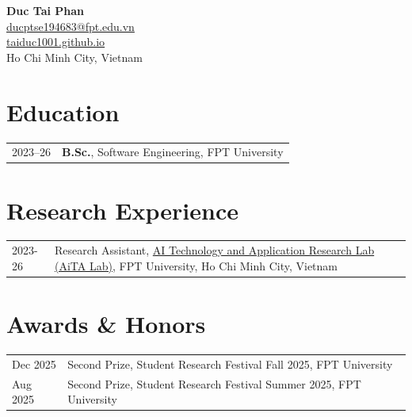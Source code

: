 \documentclass[11pt]{article} %
\newcommand{\mytitle}[4]{
  \begin{center}
    \Large\textbf{#1}\normalsize \\
    \href{mailto:#2}{#2} \\
    \href{https://#3}{#3} \\
    #4
  \end{center}
}
\begin{document}
\mytitle{Duc Tai Phan}{ducptse194683@fpt.edu.vn}{taiduc1001.github.io}{Ho Chi Minh City, Vietnam}

\RaggedRight

\setlength{\LTpre}{0pt}
\setlength{\LTpost}{2pt}

\section*{Education}
\vspace{-0.4em}
\begin{longtable}[l]{@{}p{} p{}}
  2023--26\footnotemark & \textbf{B.Sc.}, Software Engineering, FPT University \\
\end{longtable}


\renewcommand{\thefootnote}{\arabic{footnote}}
\setcounter{footnote}{1}

\vspace{-0.6em}
\section*{Research Experience}
\label{exp_research}
\vspace{-0.4em}
\begin{longtable}[l]{@{}p{} p{}}
  2023-26\footnotemark & Research Assistant, \href{https://aita-lab.github.io/}{AI Technology and Application Research Lab (AiTA Lab)}, FPT University, Ho Chi Minh City, Vietnam \\
\end{longtable}

\vspace{-0.6em}
\section*{Awards \& Honors}
\label{awards}
\vspace{-0.4em}
\begin{longtable}[l]{@{}p{} p{}}
  Dec 2025 & Second Prize, Student Research Festival Fall 2025, FPT University \\
  Aug 2025 & Second Prize, Student Research Festival Summer 2025, FPT University \\
\end{longtable}
\end{document}
